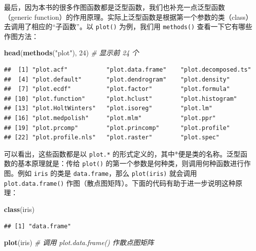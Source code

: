 \documentclass[
  b5paper,
  UTF8,twoside]{book}
\newenvironment{Shaded}{\begin{snugshade}}{\end{snugshade}}
\newcommand{\CommentTok}[1]{\textcolor[rgb]{0.56,0.35,0.01}{\textit{#1}}}
\newcommand{\DecValTok}[1]{\textcolor[rgb]{0.00,0.00,0.81}{#1}}
\newcommand{\FunctionTok}[1]{\textcolor[rgb]{0.13,0.29,0.53}{\textbf{#1}}}
\newcommand{\NormalTok}[1]{#1}
\newcommand{\StringTok}[1]{\textcolor[rgb]{0.31,0.60,0.02}{#1}}
\begin{document}
最后，因为本书的很多作图函数都是泛型函数，我们也补充一点泛型函数 （generic function）的作用原理。实际上泛型函数是根据第一个参数的类（class）去调用了相应的``子函数''。以 \texttt{plot()} 为例，我们用 \texttt{methods()} 查看一下它有哪些作图方法：

\begin{Shaded}
\begin{Highlighting}[]
\FunctionTok{head}\NormalTok{(}\FunctionTok{methods}\NormalTok{(}\StringTok{"plot"}\NormalTok{), }\DecValTok{24}\NormalTok{) }\CommentTok{\# 显示前 24 个}
\end{Highlighting}
\end{Shaded}

\begin{verbatim}
##  [1] "plot.acf"           "plot.data.frame"    "plot.decomposed.ts"
##  [4] "plot.default"       "plot.dendrogram"    "plot.density"      
##  [7] "plot.ecdf"          "plot.factor"        "plot.formula"      
## [10] "plot.function"      "plot.hclust"        "plot.histogram"    
## [13] "plot.HoltWinters"   "plot.isoreg"        "plot.lm"           
## [16] "plot.medpolish"     "plot.mlm"           "plot.ppr"          
## [19] "plot.prcomp"        "plot.princomp"      "plot.profile"      
## [22] "plot.profile.nls"   "plot.raster"        "plot.spec"
\end{verbatim}

可以看出，这些函数都是以 \texttt{plot.*} 的形式定义的，其中*便是类的名称。泛型函数的基本原理就是：传给 \texttt{plot()} 的第一个参数是何种类，则调用何种函数进行作图。例如 \texttt{iris} 的类是 \texttt{data.frame}，那么 \texttt{plot(iris)} 就会调用 \texttt{plot.data.frame()} 作图（散点图矩阵）。下面的代码有助于进一步说明这种原理：

\begin{Shaded}
\begin{Highlighting}[]
\FunctionTok{class}\NormalTok{(iris)}
\end{Highlighting}
\end{Shaded}

\begin{verbatim}
## [1] "data.frame"
\end{verbatim}

\begin{Shaded}
\begin{Highlighting}[]
\FunctionTok{plot}\NormalTok{(iris) }\CommentTok{\# 调用 plot.data.frame() 作散点图矩阵}
\end{Highlighting}
\end{Shaded}
\end{document}
